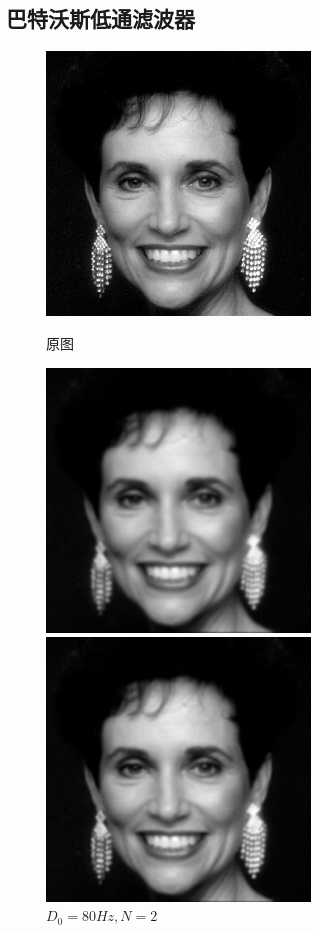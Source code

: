 \documentclass[11pt, a4paper, UTF8]{ctexart}
\begin{document}
    \subsection{巴特沃斯低通滤波器}

    \begin{figure}[H]
      \centering
      \begin{minipage}[t]{0.48\textwidth}
      \centering
      \includegraphics[width=7cm]{woman.png}
      \caption{原图}
      \end{minipage}
      \begin{minipage}[t]{0.48\textwidth}
      \centering
      \includegraphics[width=7cm]{Bw_80Hz.jpg}
      \caption{$D_0 =80Hz,N=2$}
      \end{minipage}
      \begin{minipage}[t]{0.48\textwidth}
        \centering
        \includegraphics[width=7cm]{Bw_100Hz.jpg}

\end{minipage}
\end{figure}
\end{document}
